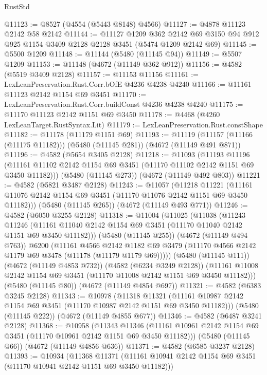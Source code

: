 \begin{lexlean}{RustStd}
\begin{coremodule}
@11123 := @8527 (@4554 (@5443 @8148) @4566)
@11127 := @4878 @11123 @2142 @58 @2142
@11144 := @11127
    @1209
    @362
    @2142
    @69
    @3150
    @94
    @912
    @925
    @1154
    @3409
    @2128
    @2128
    @3451
    (@5474 @1209 @2142 @69)
@11145 := @5500 @1209
@11148 := @11144 (@5480 (@11145 @94))
@11149 := @5507 @1209
@11153 := @11148 (@4672 (@11149 @362 @912))
@11156 := @4582 (@5519 @3409 @2128)
@11157 := @11153 @11156
@11161 := LexLeanPreservation.Rust.Corr.bOfE @4236 @4238 @4240
@11166 := @11161 @11123 @2142 @1154 @69 @3451
@11170 := LexLeanPreservation.Rust.Corr.buildConst @4236 @4238 @4240
@11175 := @11170 @11123 @2142 @1151 @69 @3450
@11178 := @4468 (@4260 LexLeanTarget.RustSyntax.Lit)
@11179 := LexLeanPreservation.Rust.constShape
@11182 := @11178 (@11179 @1151 @69)
@11193 := @11119 (@11157 (@11166 (@11175 @11182))) (@5480 (@11145 @281)) (@4672 (@11149 @491 @871))
@11196 := @4582 (@5654 @3405 @2128)
@11218 := @11093
    (@11193
      @11196
      (@11161 @11102 @2142 @1154 @69 @3451 (@11170 @11102 @2142 @1151 @69 @3450 @11182)))
    (@5480 (@11145 @273))
    (@4672 (@11149 @492 @803))
@11221 := @4582 (@5821 @3487 @2128)
@11243 := @11057
    (@11218
      @11221
      (@11161 @11076 @2142 @1154 @69 @3451 (@11170 @11076 @2142 @1151 @69 @3450 @11182)))
    (@5480 (@11145 @265))
    (@4672 (@11149 @493 @771))
@11246 := @4582 (@6050 @3255 @2128)
@11318 := @11004
    (@11025
      (@11038
        (@11243
          @11246
          (@11161 @11040 @2142 @1154 @69 @3451 (@11170 @11040 @2142 @1151 @69 @3450 @11182)))
        (@5480 (@11145 @255))
        (@4672 (@11149 @494 @763))
        @6200
        (@11161
          @4566
          @2142
          @1182
          @69
          @3479
          (@11170 @4566 @2142 @1179 @69 @3478 (@11178 (@11179 @1179 @69)))))
      (@5480 (@11145 @111))
      (@4672 (@11149 @4853 @732))
      (@4582 (@6234 @3249 @2128))
      (@11161 @11008 @2142 @1154 @69 @3451 (@11170 @11008 @2142 @1151 @69 @3450 @11182)))
    (@5480 (@11145 @80))
    (@4672 (@11149 @4854 @697))
@11321 := @4582 (@6383 @3245 @2128)
@11343 := @10978
    (@11318
      @11321
      (@11161 @10987 @2142 @1154 @69 @3451 (@11170 @10987 @2142 @1151 @69 @3450 @11182)))
    (@5480 (@11145 @222))
    (@4672 (@11149 @4855 @677))
@11346 := @4582 (@6487 @3241 @2128)
@11368 := @10958
    (@11343
      @11346
      (@11161 @10961 @2142 @1154 @69 @3451 (@11170 @10961 @2142 @1151 @69 @3450 @11182)))
    (@5480 (@11145 @66))
    (@4672 (@11149 @4856 @636))
@11371 := @4582 (@6585 @3237 @2128)
@11393 := @10934
    (@11368
      @11371
      (@11161 @10941 @2142 @1154 @69 @3451 (@11170 @10941 @2142 @1151 @69 @3450 @11182)))

\end{coremodule}
\end{lexlean}

